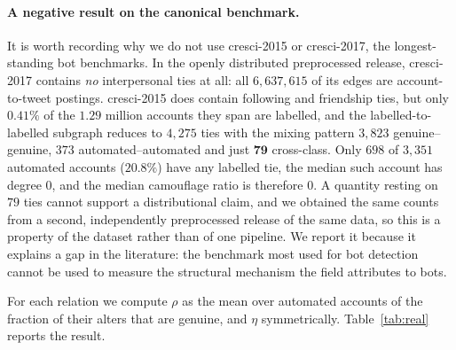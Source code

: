 \documentclass[onecolumn,pdflatex,sn-basic,Numbered]{sn-jnl}
\theoremstyle{thmstyleone}
\theoremstyle{thmstylethree}
\begin{document}
\paragraph{A negative result on the canonical benchmark.}
It is worth recording why we do not use cresci-2015 or cresci-2017, the
longest-standing bot benchmarks. In the openly distributed preprocessed release,
cresci-2017 contains \emph{no} interpersonal ties at all: all $6{,}637{,}615$ of its
edges are account-to-tweet postings. cresci-2015 does contain following and
friendship ties, but only $0.41\%$ of the $1.29$ million accounts they span are
labelled, and the labelled-to-labelled subgraph reduces to $4{,}275$ ties with the
mixing pattern $3{,}823$ genuine--genuine, $373$ automated--automated and just
$\mathbf{79}$ cross-class. Only $698$ of $3{,}351$ automated accounts ($20.8\%$) have
any labelled tie, the median such account has degree $0$, and the median camouflage
ratio is therefore $0$. A quantity resting on $79$ ties cannot support a
distributional claim, and we obtained the same counts from a second, independently
preprocessed release of the same data, so this is a property of the dataset rather
than of one pipeline. We report it because it explains a gap in the literature: the
benchmark most used for bot detection cannot be used to measure the structural
mechanism the field attributes to bots.

For each relation we compute $\rho$ as the mean over automated accounts of the
fraction of their alters that are genuine, and $\eta$ symmetrically.
Table~\ref{tab:real} reports the result.
\end{document}
